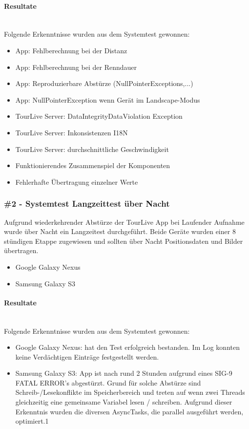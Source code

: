 \paragraph*{Resultate} \mbox{} \\
Folgende Erkenntnisse wurden aus dem Systemtest gewonnen:
\begin{itemize}[noitemsep,topsep=0pt]
	\item App: Fehlberechnung bei der Distanz
	\item App: Fehlberechnung bei der Renndauer
	\item App: Reproduzierbare Abstürze (NullPointerExceptions,...)
	\item App: NullPointerException wenn Gerät im Landscape-Modus
	\item TourLive Server: DataIntegrityDataViolation Exception
	\item TourLive Server: Inkonsistenzen I18N
	\item TourLive Server: durchschnittliche Geschwindigkeit
	\item Funktionierendes Zusammenspiel der Komponenten
	\item Fehlerhafte Übertragung einzelner Werte
\end{itemize}

\subsubsection{\#2 - Systemtest Langzeittest über Nacht}
Aufgrund wiederkehrender Abstürze der TourLive App bei Laufender Aufnahme wurde über Nacht ein Langzeitest durchgeführt. Beide Geräte wurden einer 8 stündigen Etappe zugewiesen und sollten über Nacht Positionsdaten und Bilder übertragen. 
\begin{itemize} [noitemsep,topsep=0pt]
	\item{Google Galaxy Nexus}
	\item{Samsung Galaxy S3}
\end{itemize}

\paragraph*{Resultate} \mbox{} \\
Folgende Erkenntnisse wurden aus dem Systemtest gewonnen:
\begin{itemize}[noitemsep,topsep=0pt]
	\item Google Galaxy Nexus: hat den Test erfolgreich bestanden. Im Log konnten keine Verdächtigen Einträge festgestellt werden.
	\item Samsung Galaxy S3: App ist nach rund 2 Stunden aufgrund eines SIG-9 FATAL ERROR's abgestürzt. Grund für solche Abstürze sind Schreib-/Lesekonflikte im Speicherbereich und treten auf wenn zwei Threads gleichzeitig eine gemeinsame Variabel lesen / schreiben. Aufgrund dieser Erkenntnis wurden die diversen AsyncTasks, die parallel ausgeführt werden, optimiert.1
\end{itemize}



